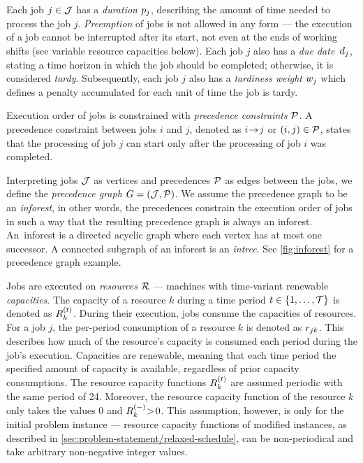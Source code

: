 Each job $j \in \mathcal{J}$ has a \emph{duration} $p_{j}$,
describing the amount of time needed to process the job $j$.
\emph{Preemption} of jobs is not allowed in any form
--- the execution of a job cannot be interrupted after its start,
not even at the ends of working shifts (see variable resource capacities below).
Each job $j$ also has a \emph{due date}~$d_{j}$,
stating a time horizon in which the job should be completed;
otherwise, it is considered \emph{tardy}.
Subsequently, each job $j$ also has a \emph{tardiness weight} $w_{j}$
which defines a penalty accumulated for each unit of time the job is tardy.

Execution order of jobs is constrained with \emph{precedence constraints} $\mathcal{P}$.
A precedence constraint between jobs $i$ and $j$,
denoted as $i \hspace{-0.2em} \rightarrow \hspace{-0.2em} j$ or $(i, j) \in \mathcal{P}$,
states that the processing of job $j$ can start only after the processing of job $i$ was completed.

Interpreting jobs $\mathcal{J}$ as vertices and precedences $\mathcal{P}$ as edges between the jobs,
we define the \emph{precedence graph} $G = (\mathcal{J}, \mathcal{P})$.
We assume the precedence graph to be an \emph{inforest}, in other words,
the precedences constrain the execution order of jobs in such a way that the resulting precedence graph
is always an inforest.
An~inforest is a directed acyclic graph where each vertex has at most one successor.
A connected subgraph of an inforest is an \emph{intree}.
See \cref{fig:inforest} for a precedence graph example.

Jobs are executed on \emph{resources} $\mathcal{R}$ --- machines with time-variant renewable \emph{capacities}.
The capacity of a resource $k$ during a time period $t \in \{{1}, \dots, {\mathcal{T}}\}$ is denoted as $\capacity{k}{t}$.
During their execution, jobs consume the capacities of resources.
For a job $j$, the per-period consumption of a resource $k$ is denoted as $r_{j k}$.
This describes how much of the resource's capacity is consumed each period during the job's execution.
Capacities are renewable, meaning that each time period the specified amount of capacity is available,
regardless of prior capacity consumptions.
The resource capacity functions $\capacity{k}{t}$ are assumed periodic with the same period of 24.
Moreover, the resource capacity function of the resource $k$ only takes the values
$0$ and $\shiftcapacity{k} \negmedspace>\! 0$.
This assumption, however, is only for the initial problem instance
--- resource capacity functions of modified instances, as described in \cref{sec:problem-statement/relaxed-schedule},
can be non-periodical and take arbitrary non-negative integer values.

